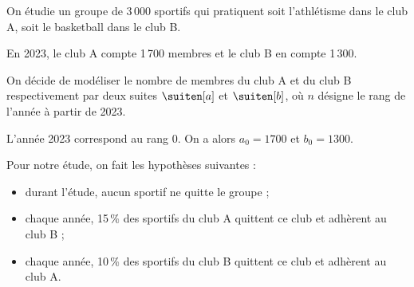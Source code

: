On étudie un groupe de 3\,000 sportifs qui pratiquent soit l'athlétisme dans le club A, soit le basketball dans le club B.

\smallskip

En 2023, le club A compte 1\,700 membres et le club B en compte 1\,300.

\smallskip

On décide de modéliser le nombre de membres du club A et du club B respectivement par deux suites $\suiten[a]$ et $\suiten[b]$, où $n$ désigne le rang de l'année à partir de 2023.

L'année 2023 correspond au rang 0. On a alors $a_0 = \num{1700}$ et $b_0 = \num{1300}$.

\smallskip

Pour notre étude, on fait les hypothèses suivantes :

\begin{itemize}
	\item durant l'étude, aucun sportif ne quitte le groupe ;
	\item chaque année, 15\,\% des sportifs du club A quittent ce club et adhèrent au club B ;
	\item chaque année, 10\,\% des sportifs du club B quittent ce club et adhèrent au club A.
\end{itemize}

